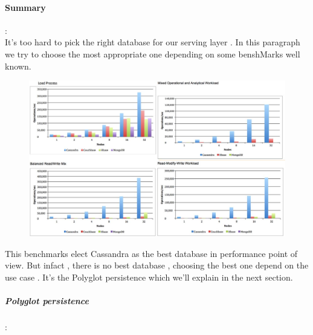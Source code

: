 \paragraph{Summary} :\\ 
\label{sec:sec01}
It's too hard to pick the right database for our serving layer . In this paragraph we try to choose the most appropriate
one depending on some benshMarks well known.
 \begin{figure}[h!]
	\centering
	\includegraphics[height=0.3\textheight]{fig01/NoSqlBenshMark}
	\label{fig:FilialesEtClients}
\end{figure}
This benchmarks elect Cassandra as the best database in performance point of view. But infact , there is no best database
, choosing the best one depend on the use case . It's the Polyglot persistence which we'll explain in the next section.

\subparagraph{Polyglot persistence } :\\
\label{sec:sec01}

